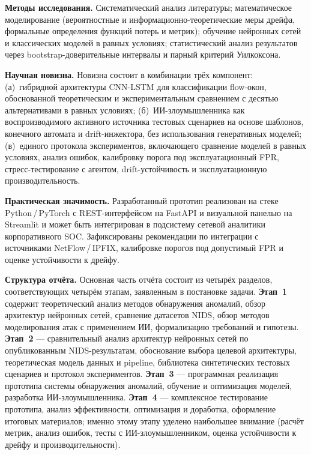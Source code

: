 \textbf{Методы исследования.} Систематический анализ литературы;
математическое моделирование (вероятностные и информационно-теоретические
меры дрейфа, формальные определения функций потерь и метрик);
обучение нейронных сетей и классических моделей в равных условиях;
статистический анализ результатов через bootstrap-доверительные
интервалы и парный критерий Уилкоксона.

\textbf{Научная новизна.} Новизна состоит в комбинации трёх
компонент: (а)~гибридной архитектуры CNN-LSTM для классификации
flow-окон, обоснованной теоретическим и экспериментальным
сравнением с десятью альтернативами в равных условиях;
(б)~ИИ-злоумышленника как воспроизводимого активного источника
тестовых сценариев на основе шаблонов, конечного автомата и
drift-инжектора, без использования генеративных моделей;
(в)~единого протокола экспериментов, включающего сравнение моделей в
равных условиях, анализ ошибок, калибровку порога под
эксплуатационный FPR, стресс-тестирование с агентом,
drift-устойчивость и эксплуатационную производительность.

\textbf{Практическая значимость.} Разработанный прототип реализован
на стеке Python\,/\,PyTorch с REST-интерфейсом на FastAPI и
визуальной панелью на Streamlit и может быть интегрирован в
подсистему сетевой аналитики корпоративного SOC. Зафиксированы
рекомендации по интеграции с источниками NetFlow\,/\,IPFIX,
калибровке порогов под допустимый FPR и оценке устойчивости к
дрейфу.

\textbf{Структура отчёта.} Основная часть отчёта состоит из четырёх
разделов, соответствующих четырём этапам, заявленным в постановке
задачи. \textbf{Этап~1} содержит теоретический анализ методов
обнаружения аномалий, обзор архитектур нейронных сетей, сравнение
датасетов NIDS, обзор методов моделирования атак с применением ИИ,
формализацию требований и гипотезы. \textbf{Этап~2} --- сравнительный
анализ архитектур нейронных сетей по опубликованным NIDS-результатам,
обоснование выбора целевой архитектуры, теоретическая модель данных
и pipeline, библиотека синтетических тестовых сценариев и протокол
экспериментов. \textbf{Этап~3} --- программная реализация прототипа
системы обнаружения аномалий, обучение и оптимизация моделей,
разработка ИИ-злоумышленника. \textbf{Этап~4} --- комплексное
тестирование прототипа, анализ эффективности, оптимизация и
доработка, оформление итоговых материалов; именно этому этапу уделено
наибольшее внимание (расчёт метрик, анализ ошибок, тесты с
ИИ-злоумышленником, оценка устойчивости к дрейфу и
производительности).
